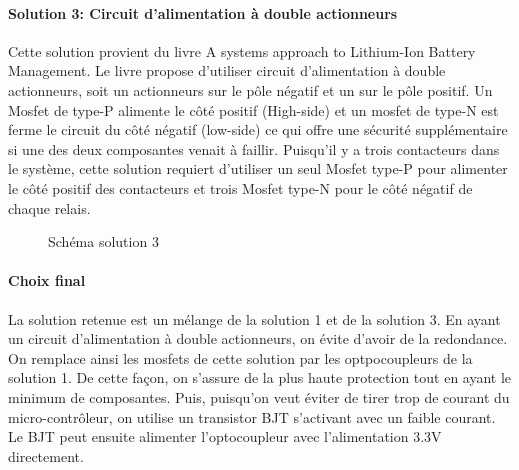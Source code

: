 		\paragraph*{Solution 3: Circuit d'alimentation à double actionneurs}
		Cette solution provient du livre A systems approach to Lithium-Ion Battery Management\cite{System_Approach}. Le livre propose d'utiliser circuit d'alimentation à double actionneurs, soit un actionneurs sur le pôle négatif et un sur le pôle positif. Un Mosfet de type-P alimente le côté positif (High-side) et un mosfet de type-N est ferme le circuit du côté négatif (low-side) ce qui offre une sécurité supplémentaire si une des deux composantes venait à faillir. Puisqu'il y a trois contacteurs dans le système, cette solution requiert d'utiliser un seul Mosfet type-P pour alimenter le côté positif des contacteurs et trois Mosfet type-N pour le côté négatif de chaque relais.

		\begin{figure}[H]
			\centering
			\caption[Solution 3]{Schéma solution 3}
			\label{fig:contactorsol3}
		\end{figure}

		
		\paragraph*{Choix final}
		La solution retenue est un mélange de la solution 1 et de la solution 3. En ayant un circuit d'alimentation à double actionneurs, on évite d'avoir de la redondance. On remplace ainsi les mosfets de cette solution par les optpocoupleurs de la solution 1. De cette façon, on s'assure de la plus haute protection tout en ayant le minimum de composantes. Puis, puisqu'on veut éviter de tirer trop de courant du micro-contrôleur, on utilise un transistor BJT s'activant avec un faible courant. Le BJT peut ensuite alimenter l'optocoupleur avec l'alimentation 3.3V directement.


